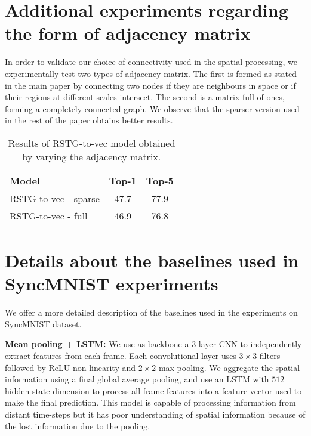 \documentclass{article}
\begin{document}
\section{Additional experiments regarding the form of adjacency matrix}

In order to validate our choice of connectivity used in the spatial processing, we experimentally test two types of adjacency matrix. The first is formed as stated in the main paper by connecting two nodes if they are neighbours in space or if their regions at different scales intersect. The second is a matrix full of ones, forming a completely connected graph.
We observe that the sparser version used in the rest of the paper obtains better results.



    \begin{table}[H]
        \caption{Results of RSTG-to-vec model obtained by varying the adjacency matrix.}
        \vspace{2mm}
        \centering
        \fontsize{9}{10}\selectfont
        \begin{tabular}{lcc}
            \toprule
            Model & Top-1  & Top-5 \\\midrule
            \midrule
            RSTG-to-vec - sparse   & 47.7 & 77.9 \\RSTG-to-vec - full   & 46.9 & 76.8 \\

            \bottomrule
        \end{tabular}
        \label{tab:ablation}
        \end{table}


\section{Details about the baselines used in SyncMNIST experiments}

We offer a more detailed description of the baselines used in the experiments on SyncMNIST dataset.

\textbf{Mean pooling + LSTM:} We use as backbone a 3-layer CNN to independently extract features from each frame. Each convolutional layer uses  $3\times3$ filters followed by ReLU non-linearity and $2\times 2$ max-pooling. We aggregate the spatial information using a final global average pooling, and use an LSTM with $512$ hidden state dimension to process all frame features into a feature vector used to make the final prediction. This model is capable of processing information from distant time-steps but it has poor understanding of spatial information because of the lost information due to the pooling.
\end{document}
